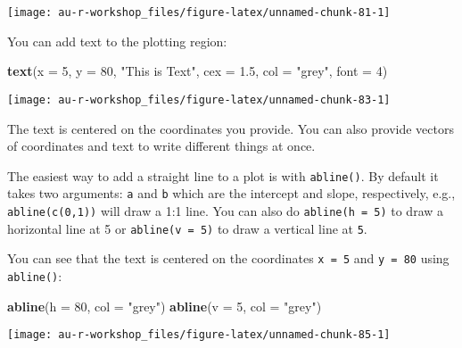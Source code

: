 \documentclass[]{book}
\newenvironment{Shaded}{\begin{snugshade}}{\end{snugshade}}
\newcommand{\KeywordTok}[1]{\textcolor[rgb]{0.13,0.29,0.53}{\textbf{#1}}}
\newcommand{\DataTypeTok}[1]{\textcolor[rgb]{0.13,0.29,0.53}{#1}}
\newcommand{\DecValTok}[1]{\textcolor[rgb]{0.00,0.00,0.81}{#1}}
\newcommand{\FloatTok}[1]{\textcolor[rgb]{0.00,0.00,0.81}{#1}}
\newcommand{\StringTok}[1]{\textcolor[rgb]{0.31,0.60,0.02}{#1}}
\newcommand{\NormalTok}[1]{#1}
\theoremstyle{definition}
\theoremstyle{definition}
\theoremstyle{definition}
\theoremstyle{remark}
\begin{document}
\begin{center}\texttt{[image: au-r-workshop\_files/figure-latex/unnamed-chunk-81-1]} \end{center}

You can add text to the plotting region:

\begin{Shaded}
\begin{Highlighting}[]
\KeywordTok{text}\NormalTok{(}\DataTypeTok{x =} \DecValTok{5}\NormalTok{, }\DataTypeTok{y =} \DecValTok{80}\NormalTok{, }\StringTok{"This is Text"}\NormalTok{, }\DataTypeTok{cex =} \FloatTok{1.5}\NormalTok{, }\DataTypeTok{col =} \StringTok{"grey"}\NormalTok{, }\DataTypeTok{font =} \DecValTok{4}\NormalTok{)}
\end{Highlighting}
\end{Shaded}

\begin{center}\texttt{[image: au-r-workshop\_files/figure-latex/unnamed-chunk-83-1]} \end{center}

The text is centered on the coordinates you provide. You can also
provide vectors of coordinates and text to write different things at
once.

The easiest way to add a straight line to a plot is with
\texttt{abline()}. By default it takes two arguments: \texttt{a} and
\texttt{b} which are the intercept and slope, respectively, e.g.,
\texttt{abline(c(0,1))} will draw a 1:1 line. You can also do
\texttt{abline(h\ =\ 5)} to draw a horizontal line at 5 or
\texttt{abline(v\ =\ 5)} to draw a vertical line at \texttt{5}.

You can see that the text is centered on the coordinates
\texttt{x\ =\ 5} and \texttt{y\ =\ 80} using \texttt{abline()}:

\begin{Shaded}
\begin{Highlighting}[]
\KeywordTok{abline}\NormalTok{(}\DataTypeTok{h =} \DecValTok{80}\NormalTok{, }\DataTypeTok{col =} \StringTok{"grey"}\NormalTok{)}
\KeywordTok{abline}\NormalTok{(}\DataTypeTok{v =} \DecValTok{5}\NormalTok{, }\DataTypeTok{col =} \StringTok{"grey"}\NormalTok{)}
\end{Highlighting}
\end{Shaded}

\begin{center}\texttt{[image: au-r-workshop\_files/figure-latex/unnamed-chunk-85-1]} \end{center}
\end{document}
